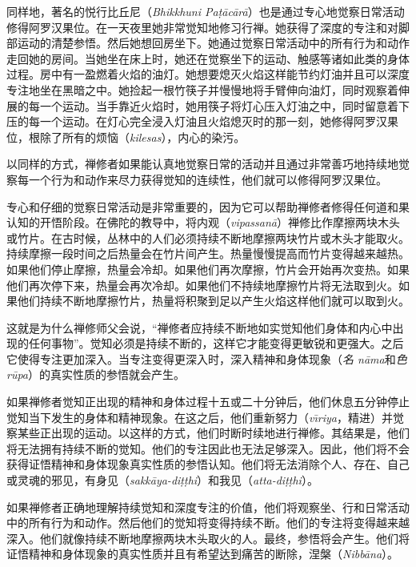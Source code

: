 同样地，著名的悦行比丘尼（{\it Bhikkhuni Pa\d t\=ac\=ar\=a}）也是通过专心地觉察日常活动修得阿罗汉果位。在一天夜里她非常觉知地修习行禅。她获得了深度的专注和对脚部运动的清楚参悟。然后她想回房坐下。她通过觉察日常活动中的所有行为和动作走回她的房间。当她坐在床上时，她还在觉察坐下的运动、触感等诸如此类的身体过程。房中有一盈燃着火焰的油灯。她想要熄灭火焰这样能节约灯油并且可以深度专注地坐在黑暗之中。她捡起一根竹筷子并慢慢地将手臂伸向油灯，同时观察着伸展的每一个运动。当手靠近火焰时，她用筷子将灯心压入灯油之中，同时留意着下压的每一个运动。在灯心完全浸入灯油且火焰熄灭时的那一刻，她修得阿罗汉果位，根除了所有的烦恼（{\it kilesas}），内心的染污。

以同样的方式，禅修者如果能认真地觉察日常的活动并且通过非常善巧地持续地觉察每一个行为和动作来尽力获得觉知的连续性，他们就可以修得阿罗汉果位。

专心和仔细的觉察日常活动是非常重要的，因为它可以帮助禅修者修得任何道和果\1认知的开悟阶段。在佛陀的教导中，将内观（{\it vipassan\=a}）禅修比作摩擦两块木头或竹片。在古时候，丛林中的人们必须持续不断地摩擦两块竹片或木头才能取火。持续摩擦一段时间之后热量会在竹片间产生。热量慢慢提高而竹片变得越来越热。如果他们停止摩擦，热量会冷却。如果他们再次摩擦，竹片会开始再次变热。如果他们再次停下来，热量会再次冷却。如果他们不持续地摩擦竹片将无法取到火。如果他们持续不断地摩擦竹片，热量将积聚到足以产生火焰这样他们就可以取到火。

这就是为什么禅修师父会说，“禅修者应持续不断地如实觉知他们身体和内心中出现的任何事物”。觉知必须是持续不断的，这样它才能变得更敏锐和更强大。之后它使得专注更加深入。当专注变得更深入时，深入精神和身体现象（{\it 名 n\=ama}和{\it 色 r\=upa}）的真实性质的参悟就会产生。

如果禅修者觉知正出现的精神和身体过程十五或二十分钟后，他们休息五分钟停止觉知当下发生的身体和精神现象。在这之后，他们重新努力（{\it v\=\i riya}，精进）并觉察某些正出现的运动。以这样的方式，他们时断时续地进行禅修。其结果是，他们将无法拥有持续不断的觉知。他们的专注因此\1也无法足够深入。因此，他们将不会获得证悟精神和身体现象真实性质的参悟认知。他们将无法消除个人、存在、自己或灵魂的邪见，有身见（{\it sakk\=aya-di\d t\d thi}）和我见（{\it atta-di\d t\d thi}）。

如果禅修者正确地理解持续觉知和深度专注的价值，他们将观察坐、行和日常活动中的所有行为和动作。然后他们的觉知将变得持续不断。他们的专注将变得越来越深入。他们就像持续不断地摩擦两块木头取火的人。最终，参悟将会产生。他们将证悟精神和身体现象的真实性质并且有希望达到痛苦的断除，涅槃（{\it Nibb\=ana}）。



\endchapter

\byebye
